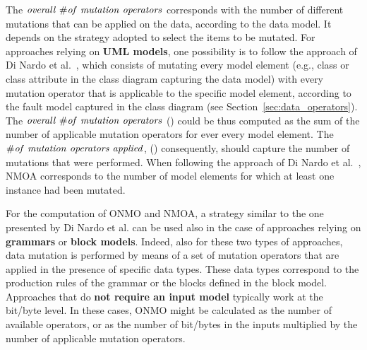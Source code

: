 The $\mathit{overall}\ \# \mathit{of}\ \mathit{mutation} \ \mathit{operators}$ corresponds with the number of different mutations that can be applied on the data, according to the data model. It depends on the strategy adopted to select the items to be mutated.
For approaches relying on \textbf{UML models}, one possibility is to follow the approach of Di Nardo et al.~\cite{di2015generating}, which consists of mutating every model element (e.g., class or class attribute in the class diagram capturing the data model) with every mutation operator that is applicable to the specific model element, according to the fault model captured in the class diagram (see Section~\ref{sec:data_operators}).
The $\mathit{overall}\ \# \mathit{of}\ \mathit{mutation} \ \mathit{operators}$ () could be thus computed as the sum of the number of applicable mutation operators for ever every model element.
The $\# \mathit{of}\ \mathit{mutation} \ \mathit{operators} \ \mathit{applied}$, () consequently, should capture the number of mutations that were performed. When following the approach of Di Nardo et al.~\cite{di2015generating}, NMOA corresponds to the number of model elements for which at least one instance had been mutated. 

For the computation of ONMO and NMOA, a strategy similar to the one presented by Di Nardo et al. can be used also in the case of approaches relying on \textbf{grammars} or \textbf{block models}. Indeed, also for these two types of approaches, data mutation is performed by means of a set of mutation operators that are applied in the presence of specific data types. 
These data types correspond to the production rules of the grammar or the blocks defined in the block model. 
Approaches that do \textbf{not require an input model} typically work at the bit/byte level. In these cases, ONMO might be calculated as the number of available operators, or
as the number of bit/bytes in the inputs multiplied by the number of applicable mutation operators.

